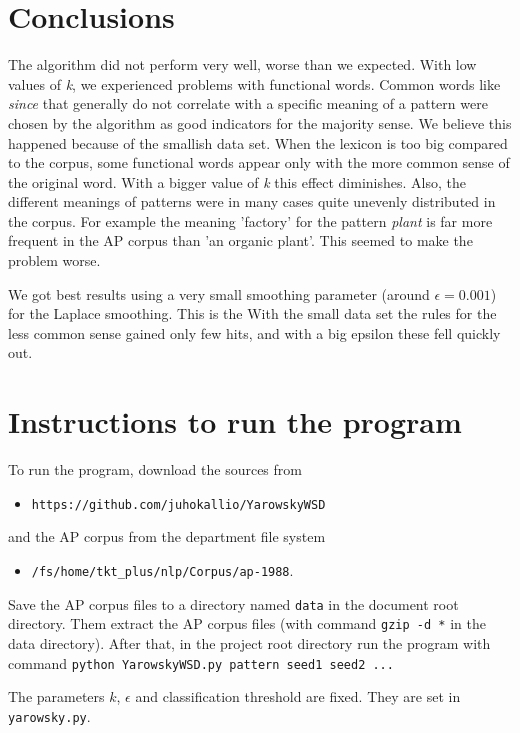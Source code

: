 \documentclass[finnish]{article}
\begin{document}
\section{Conclusions}
The algorithm did not perform very well, worse than we expected. With low values of \emph{k}, we experienced problems with functional words. Common words like \emph{since} that generally do not correlate with a specific meaning of a pattern were chosen by the algorithm as good indicators for the majority sense. We believe this happened because of the smallish data set. When the lexicon is too big compared to the corpus, some functional words appear only with the more common sense of the original word. With a bigger value of \emph{k} this effect diminishes. Also, the different meanings of patterns were in many cases quite unevenly distributed in the corpus. For example the meaning 'factory' for the pattern \emph{plant} is far more frequent in the AP corpus than 'an organic plant'. This seemed to make the problem worse.

We got best results using a very small smoothing parameter (around $\epsilon = 0.001$) for the Laplace smoothing. This is the  With the small data set the rules for the less common sense gained only few hits, and with a big epsilon these fell quickly out.

\section{Instructions to run the program}
To run the program, download the sources from
\begin{itemize}
\item \texttt{https://github.com/juhokallio/YarowskyWSD}
\end{itemize}
\noindent and the AP corpus from the department file system
\begin{itemize}
\item \texttt{/fs/home/tkt\_plus/nlp/Corpus/ap-1988}.
\end{itemize}
Save the AP corpus files to a directory named \texttt{data} in the document root directory. Them extract the AP corpus files (with command \texttt{gzip -d *} in the data directory). After that, in the project root directory run the program with command \texttt{python YarowskyWSD.py pattern seed1 seed2 ...}

The parameters $k$, $\epsilon$ and classification threshold are fixed. They are set in \texttt{yarowsky.py}.
\end{document}
